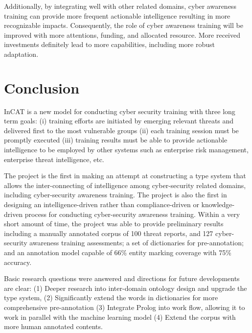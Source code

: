 \documentclass[conference]{IEEEtran}
\begin{document}
Additionally, by integrating well with other related domains, cyber awareness training can provide more frequent actionable intelligence resulting in more recognizable impacts. Consequently, the role of cyber awareness training will be improved with more attentions, funding, and allocated resource. More received investments definitely lead to more capabilities, including more robust adaptation.

\section{Conclusion}

InCAT is a new model for conducting cyber security training with three long term goals: (i) training efforts are initiated by emerging relevant threats and delivered first to the most vulnerable groups (ii) each training session must be promptly executed (iii) training results must be able to provide actionable intelligence to be employed by other systems such as enterprise risk management, enterprise threat intelligence, etc.

The project is the first in making an attempt at constructing a type system that allows the inter-connecting of intelligence among cyber-security related domains, including cyber-security awareness training. The project is also the first in designing an intelligence-driven rather than compliance-driven or knowledge-driven process for conducting cyber-security awareness training. Within a very short amount of time, the project was able to provide preliminary results including a manually annotated corpus of 100 threat reports, and 127 cyber-security awareness training assessments; a set of dictionaries for pre-annotation; and an annotation model capable of 66\% entity marking coverage with 75\% accuracy.

Basic research questions were answered and directions for future developments are clear: (1) Deeper research into inter-domain ontology design and upgrade the type system, (2) Significantly extend the words in dictionaries for more comprehensive pre-annotation (3) Integrate Prolog into work flow, allowing it to work in parallel with the machine learning model (4) Extend the corpus with more human annotated contents.
\end{document}
